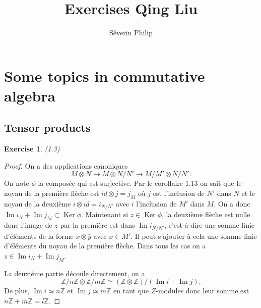 \documentclass[A4, 11pt]{article}
\author{Séverin Philip}
\newtheorem{exer}{Exercise}
\def\Z{{\mathbb Z}}
\def\Ker{  \operatorname{Ker} }
\def\Im{  \operatorname{Im} }
\begin{document}
\title{Exercises Qing Liu}
\maketitle


\section{Some topics in commutative algebra}
\subsection{Tensor products}
\begin{exer}(1.3)
\end{exer}
\begin{proof}
On a des applications canoniques
$$M\otimes N \rightarrow M\otimes N/N' \rightarrow M/M' \otimes N/N'.$$
On note $\phi$ la composée qui est surjective. Par le corollaire 1.13 on sait que le noyau de la première flèche est $id\otimes j=j_M$ où $j$ est l'inclusion de $N'$ dans $N$ et le noyau de la deuxième $i \otimes id=i_{N/N'}$ avec $i$ l'inclusion de $M'$ dans $M$. On a donc $\Im i_N+\Im j_M \subset \Ker \phi$. Maintenant si $z\in \Ker \phi$, la deuxième flèche est nulle donc l'image de $z$ par la première est dans $\Im i_{N/N'}$, c'est-à-dire une somme finie d'éléments de la forme $x\otimes \bar{y}$ avec $x\in M'$. Il peut s'ajouter à cela une somme finie d'éléments du noyau de la première flèche. Dans tous les cas on a $z\in \Im i_N +\Im j_M$. 

La deuxième partie découle directement, on a 
$$\Z/n\Z \otimes \Z/m\Z\simeq (\Z\otimes \Z)/(\Im i+\Im j).$$
De plus, $\Im i \simeq n\Z$ et $\Im j \simeq m\Z$ en tant que $Z$-modules donc leur somme est $n\Z+m\Z= l\Z$. 
\end{proof}
\end{document}
